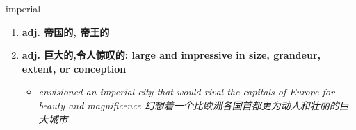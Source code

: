 
\begin{frame}
{\huge imperial}
\begin{center}
\begin{enumerate}\Large
  \item \textbf{adj. 帝国的, 帝王的}
  \item \textbf{adj. 巨大的,令人惊叹的: large and impressive in size, grandeur, extent, or conception}
  \begin{itemize}
    \item \em{\Large{envisioned an imperial city that would rival the capitals of Europe for beauty and magnificence 幻想着一个比欧洲各国首都更为动人和壮丽的巨大城市}}
  \end{itemize}
\end{enumerate}
\end{center}
\end{frame}
